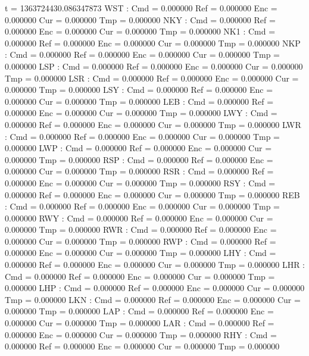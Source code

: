 \scriptsize
\begin{code}
t = 1363724430.086347873
WST : Cmd = 0.000000      Ref = 0.000000     Enc = 0.000000     Cur = 0.000000     Tmp = 0.000000    
NKY : Cmd = 0.000000      Ref = 0.000000     Enc = 0.000000     Cur = 0.000000     Tmp = 0.000000    
NK1 : Cmd = 0.000000      Ref = 0.000000     Enc = 0.000000     Cur = 0.000000     Tmp = 0.000000    
NKP : Cmd = 0.000000      Ref = 0.000000     Enc = 0.000000     Cur = 0.000000     Tmp = 0.000000    
LSP : Cmd = 0.000000      Ref = 0.000000     Enc = 0.000000     Cur = 0.000000     Tmp = 0.000000    
LSR : Cmd = 0.000000      Ref = 0.000000     Enc = 0.000000     Cur = 0.000000     Tmp = 0.000000    
LSY : Cmd = 0.000000      Ref = 0.000000     Enc = 0.000000     Cur = 0.000000     Tmp = 0.000000    
LEB : Cmd = 0.000000      Ref = 0.000000     Enc = 0.000000     Cur = 0.000000     Tmp = 0.000000    
LWY : Cmd = 0.000000      Ref = 0.000000     Enc = 0.000000     Cur = 0.000000     Tmp = 0.000000    
LWR : Cmd = 0.000000      Ref = 0.000000     Enc = 0.000000     Cur = 0.000000     Tmp = 0.000000    
LWP : Cmd = 0.000000      Ref = 0.000000     Enc = 0.000000     Cur = 0.000000     Tmp = 0.000000    
RSP : Cmd = 0.000000      Ref = 0.000000     Enc = 0.000000     Cur = 0.000000     Tmp = 0.000000    
RSR : Cmd = 0.000000      Ref = 0.000000     Enc = 0.000000     Cur = 0.000000     Tmp = 0.000000    
RSY : Cmd = 0.000000      Ref = 0.000000     Enc = 0.000000     Cur = 0.000000     Tmp = 0.000000    
REB : Cmd = 0.000000      Ref = 0.000000     Enc = 0.000000     Cur = 0.000000     Tmp = 0.000000    
RWY : Cmd = 0.000000      Ref = 0.000000     Enc = 0.000000     Cur = 0.000000     Tmp = 0.000000    
RWR : Cmd = 0.000000      Ref = 0.000000     Enc = 0.000000     Cur = 0.000000     Tmp = 0.000000    
RWP : Cmd = 0.000000      Ref = 0.000000     Enc = 0.000000     Cur = 0.000000     Tmp = 0.000000    
LHY : Cmd = 0.000000      Ref = 0.000000     Enc = 0.000000     Cur = 0.000000     Tmp = 0.000000    
LHR : Cmd = 0.000000      Ref = 0.000000     Enc = 0.000000     Cur = 0.000000     Tmp = 0.000000    
LHP : Cmd = 0.000000      Ref = 0.000000     Enc = 0.000000     Cur = 0.000000     Tmp = 0.000000    
LKN : Cmd = 0.000000      Ref = 0.000000     Enc = 0.000000     Cur = 0.000000     Tmp = 0.000000    
LAP : Cmd = 0.000000      Ref = 0.000000     Enc = 0.000000     Cur = 0.000000     Tmp = 0.000000    
LAR : Cmd = 0.000000      Ref = 0.000000     Enc = 0.000000     Cur = 0.000000     Tmp = 0.000000    
RHY : Cmd = 0.000000      Ref = 0.000000     Enc = 0.000000     Cur = 0.000000     Tmp = 0.000000    

\end{code}
